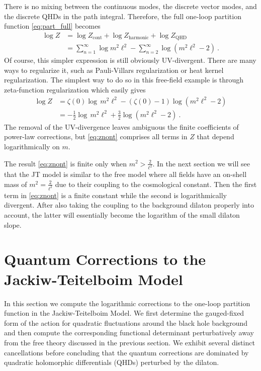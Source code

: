 \documentclass[12pt]{article}
\begin{document}
There is no mixing between the continuous modes, the discrete vector modes, and the discrete QHDs in the path integral. Therefore, the full one-loop partition function
\eqref{eq:part_full} becomes
\begin{equation}\begin{aligned}
	\log Z &= \log Z_\text{cont} + \log Z_\text{harmonic} + \log Z_\text{QHD} \\
	&= \sum_{n=1}^\infty \log m^2 \ell^2 - \sum_{n=2}^\infty \log \left(m^2 \ell^2 - 2 \right)~.
\end{aligned}\end{equation}
Of course, this simpler expression is still obviously UV-divergent.  There are many ways to regularize it, such as Pauli-Villars regularization or heat kernel regularization. The simplest way to do so in this free-field example is through zeta-function regularization which easily gives 
\begin{equation}\begin{aligned}
	\log Z &= \zeta(0)\log\,m^2 \ell^2 - (\zeta(0) - 1)\log\left(m^2 \ell^2 - 2\right) \\
	&= -\frac{1}{2}\log\,m^2 \ell^2 + \frac{3}{2}\log\left(m^2 \ell^2 - 2\right)~.
\label{eq:znont}
\end{aligned}\end{equation}
The removal of the UV-divergence leaves ambiguous the finite coefficients of power-law corrections, but \eqref{eq:znont} comprises all terms in $Z$ that depend logarithmically on $m$. 

The result \eqref{eq:znont} is finite only when $m^2 > \frac{2}{\ell^2}$. In the next section we will see that the JT model is similar to the free model where all fields have an on-shell mass of $m^2 = \frac{2}{\ell^2}$ due to their coupling to the cosmological constant. Then the first term in \eqref{eq:znont} is a finite constant while the second is logarithmically divergent. After also taking the coupling to the background dilaton properly into account, the latter will essentially become the logarithm of the small dilaton slope. 

\section{Quantum Corrections to the Jackiw-Teitelboim Model}
\label{sec:oneloop}

In this section we compute the logarithmic corrections to the one-loop partition function in  the Jackiw-Teitelboim Model. We first determine the gauged-fixed form of the action for quadratic fluctuations around the black hole background and then compute the corresponding functional determinant perturbatively away from the free theory discussed in the previous section. We exhibit several distinct cancellations before concluding that the quantum corrections are dominated by quadratic holomorphic differentials (QHDs) perturbed by the dilaton. 
\end{document}
